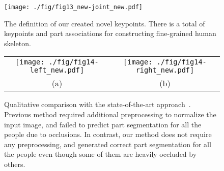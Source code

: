\documentclass[final]{IEEEtran}
\begin{document}
{\begin{minipage}{\textwidth}
\begin{figure}
	\centering
	\texttt{[image: ./fig/fig13\_new-joint\_new.pdf]}
	\caption{The definition of our created novel keypoints. There is a total of  keypoints and  part associations for constructing fine-grained human skeleton.}
	\label{fig:joint-define}
\end{figure}



\begin{figure*}[h]
	 \centering
 \setlength{\tabcolsep}{4pt}
 \begin{tabular}{cc}
    \texttt{[image: ./fig/fig14-left\_new.pdf]}
    &\texttt{[image: ./fig/fig14-right\_new.pdf]}\\
(a) & (b)\\
\end{tabular}
	\caption{Qualitative comparison with the state-of-the-art approach~\cite{varol2017learning}. Previous method required additional preprocessing to normalize the input image, and failed to predict part segmentation for all the people due to occlusions. In contrast, our method does not require any preprocessing, and generated correct part segmentation for all the people even though some of them are heavily occluded by others.}
	\label{fig:demo}
\end{figure*}



\end{minipage}}
\end{document}
